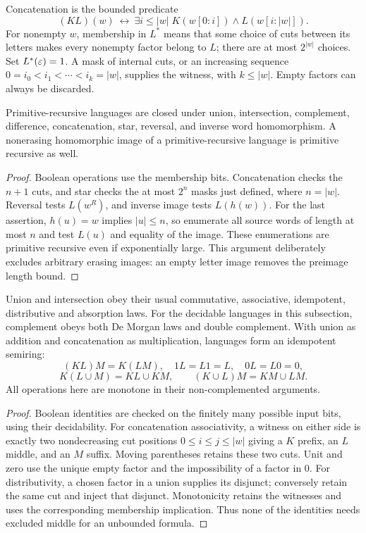 Concatenation is the bounded predicate
\[
 (KL)(w)\ \longleftrightarrow\
 \exists i\le|w|\;
 K(w[0:i])\land L(w[i:|w|]).
\]
For nonempty $w$, membership in $L^*$ means that some choice of cuts
between its letters makes every nonempty factor belong to $L$;
there are at most $2^{|w|}$ choices. Set $L^*(\varepsilon)=1$.
A mask of internal cuts, or an increasing sequence
$0=i_0<i_1<\cdots<i_k=|w|$, supplies the witness, with
$k\le|w|$. Empty factors can always be discarded.

\begin{theorem}\label{alg:prclosure}
Primitive-recursive languages are closed under union, intersection,
complement, difference, concatenation, star, reversal, and inverse word
homomorphism. A nonerasing homomorphic image of a primitive-recursive
language is primitive recursive as well.
\end{theorem}
\begin{proof}
Boolean operations use the membership bits. Concatenation checks the
$n+1$ cuts, and star checks the at most $2^n$ masks just defined, where
$n=|w|$. Reversal tests $L(w^R)$, and inverse image tests $L(h(w))$.
For the last assertion, $h(u)=w$ implies $|u|\le n$, so enumerate all
source words of length at most $n$ and test $L(u)$ and equality of the
image. These enumerations are primitive recursive even if exponentially
large. This argument deliberately excludes arbitrary erasing images:
an empty letter image removes the preimage length bound.
\end{proof}

\begin{theorem}\label{alg:semiring}
Union and intersection obey their usual commutative, associative,
idempotent, distributive and absorption laws. For the decidable languages
in this subsection, complement obeys both De Morgan laws and double
complement. With union as addition and concatenation as multiplication,
languages form an idempotent semiring:
\[
 (KL)M=K(LM),\quad 1L=L1=L,\quad 0L=L0=0,
\]
\[
 K(L\cup M)=KL\cup KM,\qquad (K\cup L)M=KM\cup LM.
\]
All operations here are monotone in their non-complemented arguments.
\end{theorem}
\begin{proof}
Boolean identities are checked on the finitely many possible input bits,
using their decidability. For concatenation associativity, a witness on
either side is exactly two nondecreasing cut positions
$0\le i\le j\le|w|$ giving a $K$ prefix, an $L$ middle, and an $M$
suffix. Moving parentheses retains these two cuts. Unit and zero use
the unique empty factor and the impossibility of a factor in $0$.
For distributivity, a chosen factor in a union supplies its disjunct;
conversely retain the same cut and inject that disjunct. Monotonicity
retains the witnesses and uses the corresponding membership implication.
Thus none of the identities needs excluded middle for an unbounded formula.
\end{proof}

